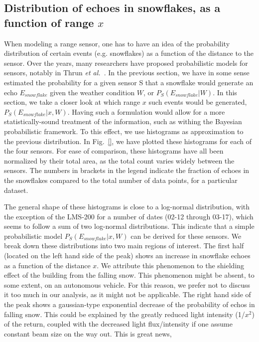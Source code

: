 \subsection{Distribution of echoes in snowflakes, as a function of range $x$}
\label{subsub:Histo}

When modeling a range sensor, one has to have an idea of the probability distribution of certain events (e.g. snowflakes) as a function of the distance to the sensor. Over the years, many researchers have proposed probabilistic models for sensors, notably in Thrun \emph{et al.}~\cite{Thrun:2005:PR:1121596}. In the previous section, we have in some sense estimated the probability for a given sensor S that a snowflake would generate an echo $E_{snowflake}$ given the weather condition $W$, or $P_S(E_{snowflake}|W)$. In this section, we take a closer look at which range $x$ such events would be generated, $P_S(E_{snowflake}|x,W)$. Having such a formulation would allow for a more statistically-sound treatment of the information, such as withing the Bayesian probabilistic framework. To this effect, we use histograms as approximation to the previous distribution. In Fig.~\ref{}, we have plotted these histograms for each of the four sensors. For ease of comparison, these histograms have all been normalized by their total area, as the total count varies widely between the sensors. The numbers in brackets in the legend indicate the fraction of echoes in the snowflakes compared to the total number of data points, for a particular dataset.


The general shape of these histograms is close to a log-normal distribution, with the exception of the LMS-200 for a number of dates (02-12 through 03-17), which seems to follow a sum of two log-normal distributions. This indicate that a simple probabilistic model $P_S(E_{snowflake}|x,W)$ can be derived for these sensors. We break down these distributions into two main regions of interest. The first half (located on the left hand side of the peak) shows an increase in snowflake echoes as a function of the distance $x$. We attribute this phenomenon to the shielding effect of the building from the falling snow. This phenomenon might be absent, to some extent, on an autonomous vehicle. For this reason, we prefer not to discuss it too much in our analysis, as it might not be applicable. The right hand side of the peak shows a gaussian-type exponential decrease of the probability of echos in falling snow. This could be explained by the greatly reduced light intensity (1/$x^2$) of the return, coupled with the decreased light flux/intensity if one assume constant beam size on the way out. This is great news, 

